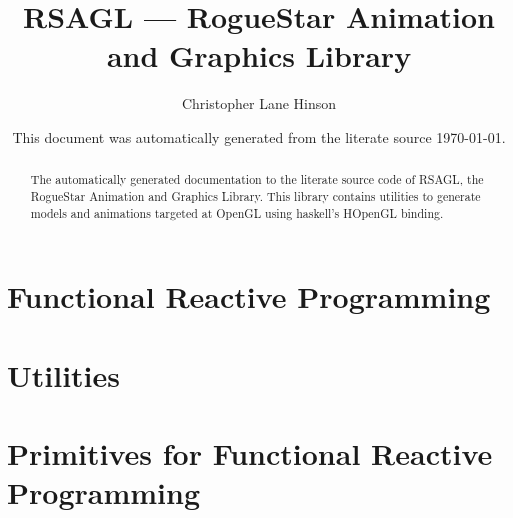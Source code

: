 \documentclass{article}
\author{Christopher Lane Hinson}
\title{ RSAGL --- RogueStar Animation and Graphics Library }
\date{ This document was automatically generated from the literate source \today. }
\begin{document}
\maketitle

\begin{abstract}
The automatically generated documentation to the literate source code of RSAGL, 
the RogueStar Animation and Graphics Library.  This library contains utilities
to generate models and animations targeted at OpenGL using haskell's HOpenGL
binding.
\end{abstract}

\tableofcontents

\part{Functional Reactive Programming}


\part{Utilities}


\part{Primitives for Functional Reactive Programming}



\end{document}
